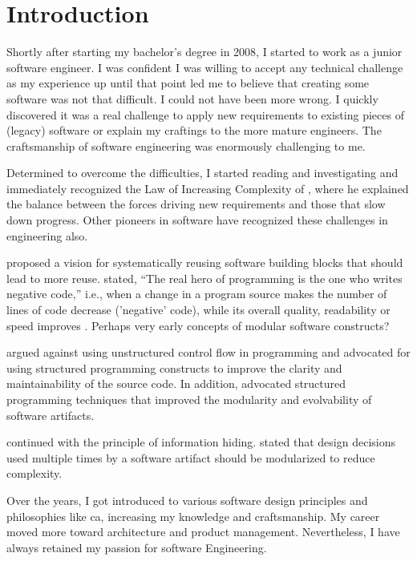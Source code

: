 \chapter{Introduction} \label{chap_introduction}

Shortly after starting my bachelor's degree in 2008, I started to work as a junior
software engineer. I was confident I was willing to accept any technical challenge as my
experience up until that point led me to believe that creating some software was not that
difficult. I could not have been more wrong. I quickly discovered it was a real challenge
to apply new requirements to existing pieces of (legacy) software or explain my craftings
to the more mature engineers. The craftsmanship of software engineering was enormously
challenging to me.

Determined to overcome the difficulties, I started reading and investigating and
immediately recognized the Law of Increasing Complexity of
\textcite{lehman_programs_1980}, where he explained the balance between the forces driving
new requirements and those that slow down progress. Other pioneers in software have
recognized these challenges in engineering also.


\textcite{d_mcilroy_nato_1968} proposed a vision for systematically reusing software building
blocks that should lead to more reuse. \textcite{d_mcilroy_nato_1968} stated, \enquote{The real
hero of programming is the one who writes negative code,} i.e., when a change in a program
source makes the number of lines of code decrease ('negative' code), while its overall
quality, readability or speed improves \parencite{wikipedia_douglas_2023}. Perhaps very
early concepts of modular software constructs?

\textcite{dijkstra_letters_1968} argued against using unstructured control flow in
programming and advocated for using structured programming constructs to improve the
clarity and maintainability of the source code. In addition,
 advocated structured programming techniques that
improved the modularity and evolvability of software artifacts.

\textcite{parnas_criteria_1972} continued with the principle of information hiding.
 stated that design decisions used multiple times by a
software artifact should be modularized to reduce complexity. 

Over the years, I got introduced to various software design principles and philosophies
like \gls{ca}, increasing my knowledge and craftsmanship. My career moved more toward
architecture and product management. Nevertheless, I have always retained my passion for
software Engineering.

